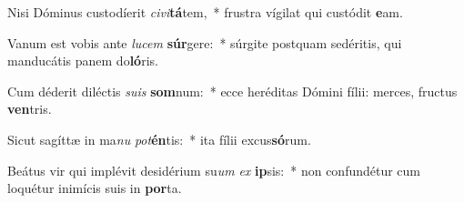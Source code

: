 \item Nisi Dóminus custodíerit \textit{ci}\textit{vi}\textbf{tá}tem,~* frustra vígilat qui custódit \textbf{e}am.
\item Vanum est vobis ante \textit{lu}\textit{cem} \textbf{súr}gere:~* súrgite postquam sedéritis, qui manducátis panem do\textbf{ló}ris.
\item Cum déderit diléctis \textit{su}\textit{is} \textbf{som}num:~* ecce heréditas Dómini fílii: merces, fructus \textbf{ven}tris.
\item Sicut sagíttæ in ma\textit{nu} \textit{pot}\textbf{én}tis:~* ita fílii excus\textbf{só}rum.
\item Beátus vir qui implévit desidérium su\textit{um} \textit{ex} \textbf{ip}sis:~* non confundétur cum loquétur inimícis suis in \textbf{por}ta.

